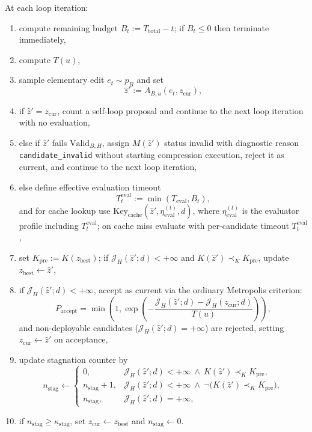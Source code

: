 \documentclass[11pt]{article}
\begin{document}
At each loop iteration:
\begin{enumerate}
    \item compute remaining budget $B_t:=T_{\mathrm{total}}-t$;
    if $B_t\le 0$ then terminate immediately,
    \item compute $T(u)$,
    \item sample elementary edit $e_t\sim p_B$ and set
    \[
    \hat z':=A_{B,u}(e_t,z_{\mathrm{cur}}),
    \]
    \item if $\hat z'=z_{\mathrm{cur}}$, count a self-loop proposal and
    continue to the next loop iteration with no evaluation,
    \item else if $\hat z'$ fails $\mathrm{Valid}_{B,H}$, assign
    $M(\hat z')$ status invalid with diagnostic reason
    \texttt{candidate\_invalid} without starting compression execution,
    reject it as current, and continue to the next loop iteration,
    \item else define effective evaluation timeout
    \[
    T_t^{\mathrm{eval}}:=\min(T_{\mathrm{eval}},B_t),
    \]
    and for cache lookup use
    $\mathrm{Key}_{\mathrm{cache}}(\hat z',\eta_{\mathrm{eval}}^{(t)},d)$,
    where $\eta_{\mathrm{eval}}^{(t)}$ is the evaluator profile including
    $T_t^{\mathrm{eval}}$; on cache miss evaluate with per-candidate timeout
    $T_t^{\mathrm{eval}}$,
    \item set $K_{\mathrm{pre}}:=K(z_{\mathrm{best}})$; if
    $\mathcal{J}_H(\hat z';d)<+\infty$ and
    $K(\hat z')\prec_K K_{\mathrm{pre}}$, update
    $z_{\mathrm{best}}\leftarrow \hat z'$,
    \item if $\mathcal{J}_H(\hat z';d)<+\infty$, accept as current via the
    ordinary Metropolis criterion:
    \[
    P_{\mathrm{accept}}=
    \min\!\left(
    1,
    \exp\!\left(-\dfrac{\mathcal{J}_H(\hat z';d)-\mathcal{J}_H(z_{\mathrm{cur}};d)}{T(u)}\right)
    \right),
    \]
    and non-deployable candidates ($\mathcal{J}_H(\hat z';d)=+\infty$) are rejected,
    setting $z_{\mathrm{cur}}\leftarrow\hat z'$ on acceptance,
    \item update stagnation counter by
    \[
    n_{\mathrm{stag}}\leftarrow
    \begin{cases}
    0,
    & \mathcal{J}_H(\hat z';d)<+\infty\ \land\ K(\hat z')\prec_K K_{\mathrm{pre}},\\
    n_{\mathrm{stag}}+1,
    & \mathcal{J}_H(\hat z';d)<+\infty\ \land\ \neg\big(K(\hat z')\prec_K K_{\mathrm{pre}}\big),\\
    n_{\mathrm{stag}},
    & \mathcal{J}_H(\hat z';d)=+\infty,
    \end{cases}
    \]
    \item if $n_{\mathrm{stag}}\ge\kappa_{\mathrm{stag}}$, set
    $z_{\mathrm{cur}}\leftarrow z_{\mathrm{best}}$ and
    $n_{\mathrm{stag}}\leftarrow 0$.
\end{enumerate}
\end{document}
